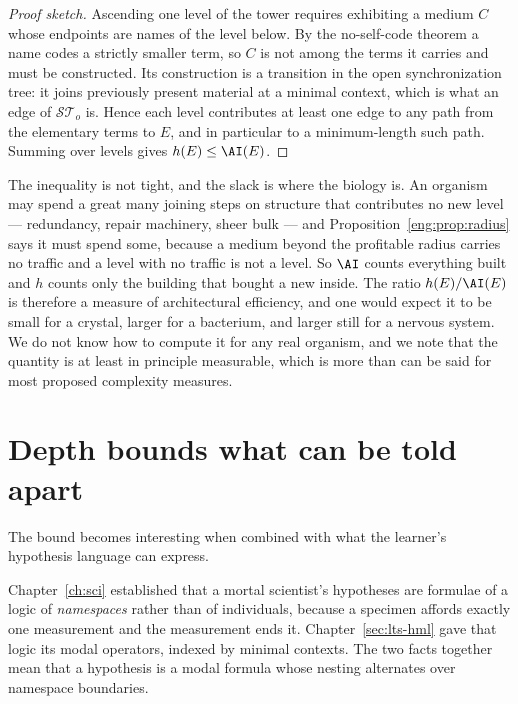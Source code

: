 \begin{proof}[Proof sketch]
Ascending one level of the tower requires exhibiting a medium $C$ whose
endpoints are names of the level below.
By the no-self-code theorem a name codes a strictly smaller term, so $C$
is not among the terms it carries and must be constructed.
Its construction is a transition in the open synchronization tree: it
joins previously present material at a minimal context, which is what an
edge of $\mathcal{ST}_o$ is.
Hence each level contributes at least one edge to any path from the
elementary terms to $E$, and in particular to a minimum-length such path.
Summing over levels gives $h(E) \leq \AI(E)$.
\end{proof}

\begin{remark}
\label{rmk:ai-loose}
The inequality is not tight, and the slack is where the biology is.
An organism may spend a great many joining steps on structure that
contributes no new level --- redundancy, repair machinery, sheer bulk ---
and Proposition~\ref{eng:prop:radius} says it must spend some, because a
medium beyond the profitable radius carries no traffic and a level with
no traffic is not a level.
So $\AI$ counts everything built and $h$ counts only the building that
bought a new inside.
The ratio $h(E)/\AI(E)$ is therefore a measure of architectural
efficiency, and one would expect it to be small for a crystal, larger for
a bacterium, and larger still for a nervous system.
We do not know how to compute it for any real organism, and we note that
the quantity is at least in principle measurable, which is more than can
be said for most proposed complexity measures.
\end{remark}

\section{Depth bounds what can be told apart}

The bound becomes interesting when combined with what the learner's
hypothesis language can express.

Chapter~\ref{ch:sci} established that a mortal scientist's hypotheses are
formulae of a logic of \emph{namespaces} rather than of individuals,
because a specimen affords exactly one measurement and the measurement
ends it.
Chapter~\ref{sec:lts-hml} gave that logic its modal operators, indexed by
minimal contexts.
The two facts together mean that a hypothesis is a modal formula whose
nesting alternates over namespace boundaries.

